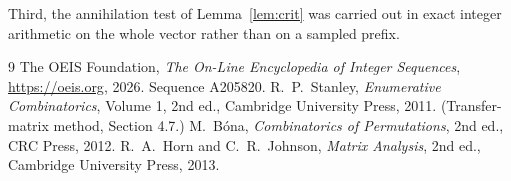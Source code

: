 \documentclass[11pt,a4paper]{article}
\theoremstyle{plain}
\theoremstyle{definition}
\begin{document}
Third, the annihilation test of Lemma~\ref{lem:crit} was carried out in exact integer
arithmetic on the whole vector rather than on a sampled prefix.

\begin{thebibliography}{9}
 The OEIS Foundation, \emph{The On-Line Encyclopedia of Integer
Sequences}, \url{https://oeis.org}, 2026. Sequence A205820.
 R.~P.~Stanley, \emph{Enumerative Combinatorics}, Volume 1, 2nd ed.,
Cambridge University Press, 2011. (Transfer-matrix method, Section 4.7.)
 M.~B\'ona, \emph{Combinatorics of Permutations}, 2nd ed., CRC
Press, 2012.
 R.~A.~Horn and C.~R.~Johnson, \emph{Matrix Analysis}, 2nd ed., Cambridge
University Press, 2013.
\end{thebibliography}
\end{document}
